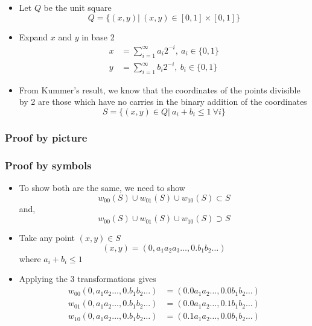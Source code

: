 \documentclass{beamer}
\begin{document}
\begin{frame}
    \begin{itemize}
        \item Let $Q$ be the unit square 
        \begin{equation*}
            Q = \{(x,y) | \ (x,y) \in [0,1] \times [0,1]\}
        \end{equation*}
        \item Expand $x$ and $y$ in base 2
        \begin{align*}
            x &= \sum_{i=1}^\infty a_i 2^{-i}, \ a_i \in \{0,1\} \\
            y &= \sum_{i=1}^\infty b_i 2^{-i}, \ b_i \in \{0,1\}
        \end{align*}
        \item From Kummer's result, we know that the coordinates of the points divisible by 2 are those which have no carries in the binary addition of the coordinates
        \begin{equation*}
            S = \{(x,y) \in Q| \ a_i + b_i \leq 1 \ \forall i\}
        \end{equation*} 
    \end{itemize}
\end{frame}

\begin{frame}
    \frametitle{Proof by picture}
\end{frame}

\begin{frame}
    \frametitle{Proof by symbols}
    \begin{itemize}
        \item To show both are the same, we need to show
        \begin{equation*}
            w_{00}(S) \cup w_{01}(S) \cup w_{10}(S) \subset S 
        \end{equation*}
        and, 
        \begin{equation*}
            w_{00}(S) \cup w_{01}(S) \cup w_{10}(S) \supset S
        \end{equation*}
        \item Take any point $(x,y) \in S$ 
        \begin{equation*}
            (x,y) = (0,a_1a_2a_3\dots,0.b_1 b_2 \dots)
        \end{equation*}
        where $a_i + b_i \leq 1$
        \item Applying the 3 transformations gives 
        \begin{align*}
            w_{00}(0,a_1a_2\dots,0.b_1 b_2 \dots) &= (0.0a_1a_2\dots,0.0b_1 b_2 \dots) \\
            w_{01}(0,a_1a_2\dots,0.b_1 b_2 \dots) &= (0.0a_1a_2\dots,0.1b_1 b_2 \dots) \\
            w_{10}(0,a_1a_2\dots,0.b_1 b_2 \dots) &= (0.1a_1a_2\dots,0.0b_1 b_2 \dots)
        \end{align*}
    \end{itemize}
\end{frame}
\end{document}
